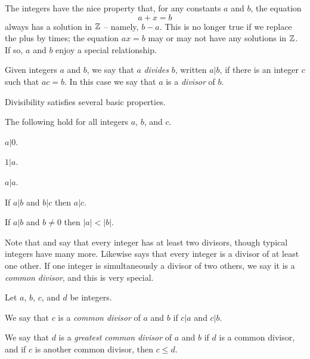 The integers have the nice property that, for any constants \(a\) and \(b\), the equation \[ a + x = b \] always has a solution in \(\mathbb{Z}\) -- namely, \(b - a\).
This is no longer true if we replace the plus by times; the equation \(ax = b\) may or may not have any solutions in \(\mathbb{Z}\).
If so, \(a\) and \(b\) enjoy a special relationship.

\begin{dfn}[Divides]
Given integers \(a\) and \(b\), we say that \(a\) \emph{divides} \(b\), written \(a|b\), if there is an integer \(c\) such that \(ac = b\).
In this case we say that \(a\) is a \emph{divisor} of \(b\).
\end{dfn}

Divisibility satisfies several basic properties.

\begin{prop}\label{prop:int-div}
The following hold for all integers \(a\), \(b\), and \(c\).
\begin{proplist*}
\item \label{prop:int-div:zero} \(a|0\).
\item \label{prop:int-div:one} \(1|a\).
\item \label{prop:int-div:self} \(a|a\).
\item If \(a|b\) and \(b|c\) then \(a|c\).
\item \label{prop:int-div:bound} If \(a|b\) and \(b \neq 0\) then \(|a| < |b|\).
\end{proplist*}
\end{prop}

Note that  and  say that every integer has at least two divisors, though typical integers have many more.
Likewise  says that every integer is a divisor of at least one other.
If one integer is simultaneously a divisor of two others, we say it is a \emph{common divisor}, and this is very special.

\begin{dfn}
Let \(a\), \(b\), \(c\), and \(d\) be integers.
\begin{proplist}
\item We say that \(c\) is a \emph{common divisor} of \(a\) and \(b\) if \(c|a\) and \(c|b\).
\item We say that \(d\) is a \emph{greatest common divisor} of \(a\) and \(b\) if \(d\) is a common divisor, and if \(c\) is another common divisor, then \(c \leq d\).
\end{proplist}
\end{dfn}

